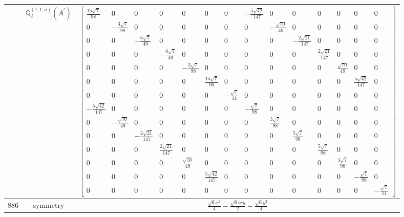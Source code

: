 \documentclass[fleqn,8pt,landscape]{jsarticle}
\begin{document}
\begin{longtable}{ccc}
$  $ & $ \mathbb{Q}_{2}^{(1,1;a)}(A^{\prime}) $ & $ \begin{bmatrix} \frac{15 \sqrt{7}}{98} & 0 & 0 & 0 & 0 & 0 & 0 & - \frac{5 \sqrt{42}}{147} & 0 & 0 & 0 & 0 & 0 & 0 \\ 0 & - \frac{3 \sqrt{7}}{98} & 0 & 0 & 0 & 0 & 0 & 0 & - \frac{\sqrt{70}}{49} & 0 & 0 & 0 & 0 & 0 \\ 0 & 0 & - \frac{6 \sqrt{7}}{49} & 0 & 0 & 0 & 0 & 0 & 0 & - \frac{2 \sqrt{21}}{147} & 0 & 0 & 0 & 0 \\ 0 & 0 & 0 & - \frac{6 \sqrt{7}}{49} & 0 & 0 & 0 & 0 & 0 & 0 & \frac{2 \sqrt{21}}{147} & 0 & 0 & 0 \\ 0 & 0 & 0 & 0 & - \frac{3 \sqrt{7}}{98} & 0 & 0 & 0 & 0 & 0 & 0 & \frac{\sqrt{70}}{49} & 0 & 0 \\ 0 & 0 & 0 & 0 & 0 & \frac{15 \sqrt{7}}{98} & 0 & 0 & 0 & 0 & 0 & 0 & \frac{5 \sqrt{42}}{147} & 0 \\ 0 & 0 & 0 & 0 & 0 & 0 & - \frac{\sqrt{7}}{14} & 0 & 0 & 0 & 0 & 0 & 0 & 0 \\ - \frac{5 \sqrt{42}}{147} & 0 & 0 & 0 & 0 & 0 & 0 & - \frac{\sqrt{7}}{98} & 0 & 0 & 0 & 0 & 0 & 0 \\ 0 & - \frac{\sqrt{70}}{49} & 0 & 0 & 0 & 0 & 0 & 0 & \frac{3 \sqrt{7}}{98} & 0 & 0 & 0 & 0 & 0 \\ 0 & 0 & - \frac{2 \sqrt{21}}{147} & 0 & 0 & 0 & 0 & 0 & 0 & \frac{5 \sqrt{7}}{98} & 0 & 0 & 0 & 0 \\ 0 & 0 & 0 & \frac{2 \sqrt{21}}{147} & 0 & 0 & 0 & 0 & 0 & 0 & \frac{5 \sqrt{7}}{98} & 0 & 0 & 0 \\ 0 & 0 & 0 & 0 & \frac{\sqrt{70}}{49} & 0 & 0 & 0 & 0 & 0 & 0 & \frac{3 \sqrt{7}}{98} & 0 & 0 \\ 0 & 0 & 0 & 0 & 0 & \frac{5 \sqrt{42}}{147} & 0 & 0 & 0 & 0 & 0 & 0 & - \frac{\sqrt{7}}{98} & 0 \\ 0 & 0 & 0 & 0 & 0 & 0 & 0 & 0 & 0 & 0 & 0 & 0 & 0 & - \frac{\sqrt{7}}{14} \end{bmatrix} $ \\ \hline
$ 886 $ & $ \text{symmetry} $ & $ \frac{\sqrt{6} x^{2}}{4} - \frac{\sqrt{6} i x y}{2} - \frac{\sqrt{6} y^{2}}{4} $ \\

\end{longtable}
\end{document}
